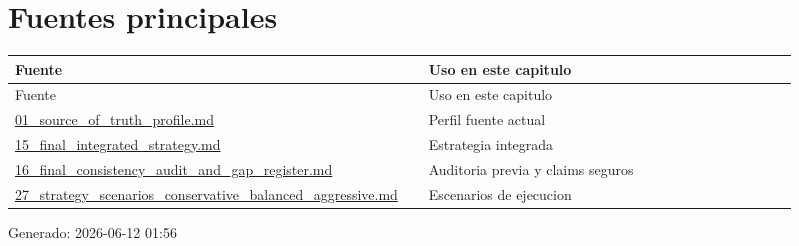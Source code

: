\section{Fuentes principales}


\begin{center}
\scriptsize
\begin{longtable}{>{\raggedright\arraybackslash}p{0.455\linewidth} >{\raggedright\arraybackslash}p{0.455\linewidth}}
\toprule
Fuente & Uso en este capitulo \\
\midrule
\endfirsthead
\toprule
Fuente & Uso en este capitulo \\
\midrule
\endhead
\href{file:///E:/Laboral/01_source_of_truth_profile.md}{01\_source\_of\_truth\_profile.md} & Perfil fuente actual \\
\href{file:///E:/Laboral/15_final_integrated_strategy.md}{15\_final\_integrated\_strategy.md} & Estrategia integrada \\
\href{file:///E:/Laboral/16_final_consistency_audit_and_gap_register.md}{16\_final\_consistency\_audit\_and\_gap\_register.md} & Auditoria previa y claims seguros \\
\href{file:///E:/Laboral/27_strategy_scenarios_conservative_balanced_aggressive.md}{27\_strategy\_scenarios\_conservative\_balanced\_aggressive.md} & Escenarios de ejecucion \\
\bottomrule
\end{longtable}
\end{center}



Generado: 2026-06-12 01:56

